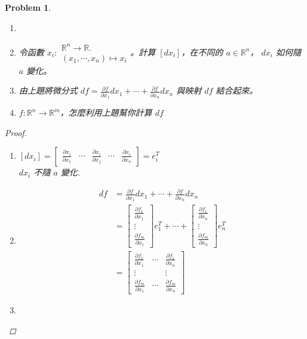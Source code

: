 \documentclass[10pt,a4paper]{article}
\newcounter{theProblemCounter}
\newtheorem{problem}[theProblemCounter]{Problem}
\begin{document}
\setcounter{theProblemCounter}{7}
\begin{problem}
\begin{enumerate}
\item[]
\item[(a)] 令函數 $x_i:\begin{array}{c}\mathbb{R}^n\to \mathbb{R}.\\ (x_1,\cdots, x_n)\mapsto x_i\end{array}$。計算 $[dx_i]$，在不同的 $a\in \mathbb{R}^n$， $dx_i$ 如何隨 $a$ 變化。
\item[(b)] 由上題將微分式 $df=\frac{\partial f}{\partial x_1} dx_1 + \cdots + \frac{\partial f}{\partial x_n} dx_n$ 與映射 $df$ 結合起來。
\item[(c)] $f:\mathbb{R}^n\to \mathbb{R}^m$，怎麼利用上題幫你計算 $df$
\end{enumerate}
\begin{proof}
\begin{enumerate}
\item[(a)]
$[dx_i]=\begin{bmatrix}\frac{\partial x_i}{\partial x_1}&\cdots& \frac{\partial x_i}{\partial x_j} & \cdots & \frac{\partial x_i}{\partial x_n}\end{bmatrix}=e_i^T$\\
$dx_i$ 不隨 $a$ 變化.
\item[(b)]
\begin{align*}
df&=\frac{\partial f}{\partial x_1} dx_1 + \cdots + \frac{\partial f}{\partial x_n} dx_n\\
&=\begin{bmatrix}\frac{\partial f_1}{\partial x_1}\\ \vdots \\ \frac{\partial f_m}{\partial x_1}\end{bmatrix}e_1^T + \cdots + \begin{bmatrix}\frac{\partial f_1}{\partial x_n}\\ \vdots \\ \frac{\partial f_m}{\partial x_n}\end{bmatrix}e_n^T\\
&=\begin{bmatrix}\frac{\partial f_1}{\partial x_1} & \cdots & \frac{\partial f_1}{\partial x_n}\\ \vdots& &\vdots \\ \frac{\partial f_m}{\partial x_1} & \cdots & \frac{\partial f_m}{\partial x_n}\end{bmatrix}
\end{align*}
\item[(c)]
\end{enumerate}
\end{proof}
\end{problem}
\end{document}
